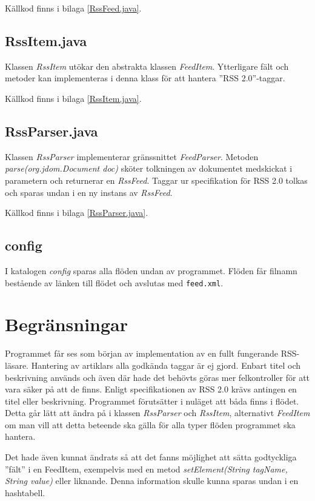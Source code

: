 \documentclass[titlepage, twoside, a4paper, 12pt]{article}
\begin{document}
Källkod finns i bilaga \ref{RssFeed.java}.
\subsection{RssItem.java}\label{RssItem}
Klassen \textit{RssItem} utökar den abstrakta klassen
\textit{FeedItem}. Ytterligare fält och metoder kan implementeras i
denna klass för att hantera ''RSS 2.0''-taggar.

Källkod finns i bilaga \ref{RssItem.java}.
\subsection{RssParser.java}\label{RssParser}
Klassen \textit{RssParser} implementerar gränssnittet
\textit{FeedParser}. Metoden \textit{parse(org.jdom.Document doc)}
sköter tolkningen av dokumentet medskickat i parametern och returnerar
en \textit{RssFeed}. Taggar ur specifikation för RSS 2.0 tolkas och
sparas undan i en ny instans av \textit{RssFeed}.

Källkod finns i bilaga \ref{RssParser.java}.
\subsection{config}
I katalogen \textit{config} sparas alla flöden undan av
programmet. Flöden får filnamn bestående av länken till flödet och
avslutas med \verb!feed.xml!.

\section{Begränsningar}\label{Begransningar}

Programmet får ses som början av implementation av en fullt fungerande
RSS-läsare. Hantering av artiklars alla godkända taggar är ej
gjord. Enbart titel och beskrivning används och även där hade det
behövts göras mer felkontroller för att vara säker på att de
finns. Enligt specifikationen av RSS 2.0 krävs antingen en titel eller
beskrivning. Programmet förutsätter i nuläget att båda finns i
flödet. Detta går lätt att ändra på i klassen \textit{RssParser} och
\textit{RssItem}, alternativt \textit{FeedItem} om man vill att detta
beteende ska gälla för alla typer flöden programmet ska hantera.

Det hade även kunnat ändrats så att det fanns möjlighet att sätta
godtyckliga ''fält'' i en FeedItem, exempelvis med en metod
\textit{setElement(String tagName, String value)} eller
liknande. Denna information skulle kunna sparas undan i en hashtabell.
\end{document}
